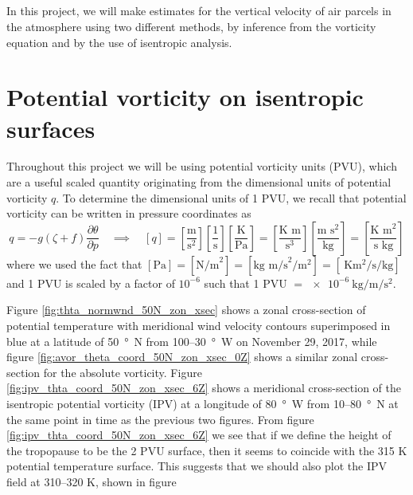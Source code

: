 \documentclass[11pt]{article}
\title{\spacedlowsmallcaps{\small 12.818: Introduction to Atmospheric Data and Large-scale Dynamics}\\ \spacedlowsmallcaps{\Large Project nine: Isentropic Potential Vorticity and Tropopause Temperature Maps}}
\author{\spacedlowsmallcaps{Ali Ramadhan}}
\date{}
\newcommand\p[2]{\frac{\partial #1}{\partial #2}}
\begin{document}
\maketitle

In this project, we will make estimates for the vertical velocity of air parcels in the atmosphere using two different methods, by inference from the vorticity equation and by the use of isentropic analysis.

\section{Potential vorticity on isentropic surfaces}
Throughout this project we will be using potential vorticity units (PVU), which are a useful scaled quantity originating from the dimensional units of potential vorticity $q$. To determine the dimensional units of 1 PVU, we recall that potential vorticity can be written in pressure coordinates as
\begin{equation*}
q = -g(\zeta + f)\p{\theta}{p} \quad \implies \quad
[q] = \left[\frac{\text{m}}{\text{s}^2}\right] \left[\frac{1}{\text{s}}\right] \left[\frac{\text{K}}{\text{Pa}}\right]
= \left[\frac{\text{K m}}{\text{s}^3}\right] \left[\frac{\text{m s}^2}{\text{kg}}\right]
= \left[\frac{\text{K m}^2}{\text{s kg}}\right]
\end{equation*}
where we used the fact that $[\text{Pa}] = [\text{N/m}^2] = [\text{kg m/s}^2/\text{m}^2] = [\SI{}{\K\m\squared\per\second\per\kg}]$ and 1 PVU is scaled by a factor of $10^{-6}$ such that 1 PVU $= \SI{e-6}{\kg\per\m\per\s\squared}$.

Figure \ref{fig:thta_normwnd_50N_zon_xsec} shows a zonal cross-section of potential temperature with meridional wind velocity contours superimposed in blue at a latitude of \SI{50}{\degree N} from 100--\SI{30}{\degree W} on November 29, 2017, while figure \ref{fig:avor_theta_coord_50N_zon_xsec_0Z} shows a similar zonal cross-section for the absolute vorticity. Figure \ref{fig:ipv_thta_coord_50N_zon_xsec_6Z} shows a meridional cross-section of the isentropic potential vorticity (IPV) at a longitude of \SI{80}{\degree W} from 10--\SI{80}{\degree N} at the same point in time as the previous two figures. From figure \ref{fig:ipv_thta_coord_50N_zon_xsec_6Z} we see that if we define the height of the tropopause to be the 2 PVU surface, then it seems to coincide with the 315 K potential temperature surface. This suggests that we should also plot the IPV field at 310--320 K, shown in figure 
\end{document}
